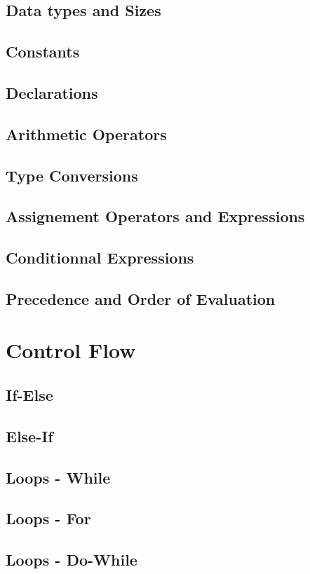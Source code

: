 \documentclass{scrartcl}
\begin{document}
        \subsection{Data types and Sizes}
        \subsection{Constants}
        \subsection{Declarations}
        \subsection{Arithmetic Operators}
        \subsection{Type Conversions}
        \subsection{Assignement Operators and Expressions}
        \subsection{Conditionnal Expressions}
        \subsection{Precedence and Order of Evaluation}
    \section{Control Flow}
        \subsection{If-Else}
        \subsection{Else-If}
        \subsection{Loops - While}
        \subsection{Loops - For}
        \subsection{Loops - Do-While}
\end{document}
